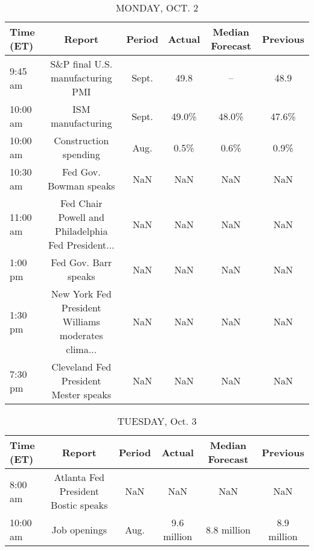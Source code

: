 \documentclass{article}%
\begin{document}
%
\normalsize%


\begin{table}[htbp]%
\caption{MONDAY, OCT. 2}%
\centering%
\begin{adjustbox}{width=1\textwidth}%
\begin{tabular}{lccccc}
\toprule
Time (ET) &                                             Report & Period & Actual & Median Forecast & Previous \\
\midrule
  9:45 am &                   S\&P final U.S. manufacturing PMI &  Sept. &   49.8 &              -- &     48.9 \\
 10:00 am &                                  ISM manufacturing &  Sept. &  49.0\% &           48.0\% &    47.6\% \\
 10:00 am &                              Construction spending &   Aug. &   0.5\% &            0.6\% &     0.9\% \\
 10:30 am &                             Fed Gov. Bowman speaks &    NaN &    NaN &             NaN &      NaN \\
 11:00 am & Fed Chair Powell and Philadelphia Fed President... &    NaN &    NaN &             NaN &      NaN \\
  1:00 pm &                               Fed Gov. Barr speaks &    NaN &    NaN &             NaN &      NaN \\
  1:30 pm & New York Fed President Williams moderates clima... &    NaN &    NaN &             NaN &      NaN \\
  7:30 pm &              Cleveland Fed President Mester speaks &    NaN &    NaN &             NaN &      NaN \\
\bottomrule
\end{tabular}
%
\end{adjustbox}%
\end{table}

%


\begin{table}[htbp]%
\caption{TUESDAY, Oct. 3}%
\centering%
\begin{adjustbox}{width=1\textwidth}%
\begin{tabular}{lccccc}
\toprule
Time (ET) &                              Report & Period &      Actual & Median Forecast &    Previous \\
\midrule
  8:00 am & Atlanta Fed President Bostic speaks &    NaN &         NaN &             NaN &         NaN \\
 10:00 am &                        Job openings &   Aug. & 9.6 million &     8.8 million & 8.9 million \\
\bottomrule
\end{tabular}
%
\end{adjustbox}%
\end{table}
\end{document}
